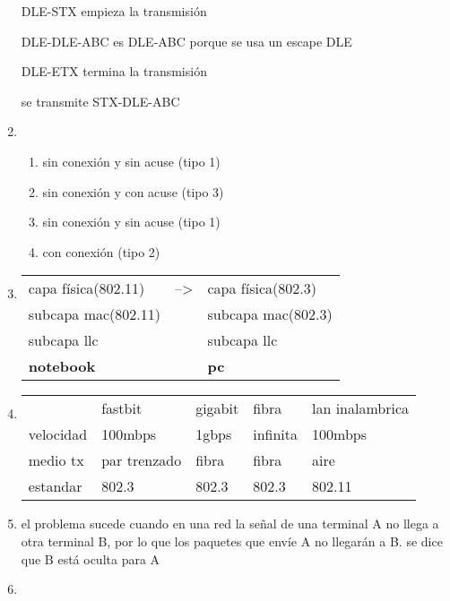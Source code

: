 \documentclass[11pt]{article}
\begin{document}
\begin{enumerate}
DLE-STX empieza la transmisión

DLE-DLE-ABC es DLE-ABC porque se usa un escape DLE

DLE-ETX termina la transmisión

se transmite STX-DLE-ABC
\item \begin{enumerate}
\item sin conexión y sin acuse (tipo 1)
\item sin conexión y con acuse (tipo 3)
\item sin conexión y sin acuse (tipo 1)
\item con conexión (tipo 2)
\end{enumerate}
\item \begin{center}
\begin{tabular}{lll}
capa física(802.11) & --> & capa física(802.3)\\
subcapa mac(802.11) &  & subcapa mac(802.3)\\
subcapa llc &  & subcapa llc\\
\textbf{notebook} &  & \textbf{pc}\\
\end{tabular}
\end{center}
\item \begin{center}
\begin{tabular}{lllll}
 & fastbit & gigabit & fibra & lan inalambrica\\
velocidad & 100mbps & 1gbps & infinita & 100mbps\\
medio tx & par trenzado & fibra & fibra & aire\\
estandar & 802.3 & 802.3 & 802.3 & 802.11\\
\end{tabular}
\end{center}
\item el problema sucede cuando en una red la señal de una terminal A no llega a otra terminal B, por lo que los paquetes que envíe A no llegarán a B. se dice que B está oculta para A
\item 
\end{enumerate}
\end{document}
